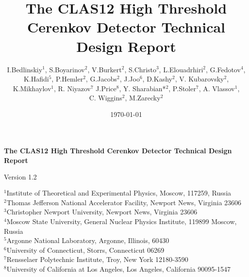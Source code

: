 \documentclass[12pt]{article}
\title{The CLAS12 High Threshold Cerenkov Detector Technical Design Report}
\author{I.Bedlinskiy$^{1}$, S.Boyarinov$^{2}$, V.Burkert$^{2}$, S.Christo$^{3}$, L.Elouadrhiri$^{2}$, G.Fedotov$^{4}$, \\ K.Hafidi$^{5}$, P.Hemler$^{2}$, G.Jacobs$^{2}$, J.Joo$^{6}$, D.Kashy$^{2}$,  V. Kubarovsky$^{2}$,  \\ K.Mikhaylov$^{1}$, R. Niyazov$^{7}$  J.Price$^{8}$, Y. Sharabian*$^{2}$, P.Stoler$^{7}$, A. Vlassov$^{1}$, \\ C. Wiggins$^{2}$, M.Zarecky$^{2}$}
\date{\today}
\begin{document}
\thispagestyle{empty}
\begin{center}
{\Huge \bf The CLAS12 High Threshold Cerenkov Detector Technical Design Report}
\end{center}
\vspace{2cm}
\begin{figure}[ht]
\begin{center}
\vspace{1cm}
\end{center}
\end{figure}

\begin{center}
\Large Version 1.2
\end{center}

\newpage



\maketitle



\vspace{2cm}

\begin{center}
$^{1}$Institute of Theoretical and Experimental Physics, Moscow, 117259, Russia\\
$^{2}$Thomas Jefferson National Accelerator Facility, Newport News, Virginia 23606\\ 
$^{3}$Christopher Newport University, Newport News, Virginia 23606\\
$^{4}$Moscow State University, General Nuclear Physics Institute, 119899 Moscow, Russia\\
$^{5}$Argonne National Laboratory, Argonne, Illinois, 60430\\
$^{6}$University of Connecticut, Storrs, Connecticut 06269\\
$^{7}$Rensselaer Polytechnic Institute, Troy, New York 12180-3590\\
$^{8}$University of California at Los Angeles, Los Angeles, California  90095-1547
\end{center}

	
\thispagestyle{empty}

\newpage

\tableofcontents

\newpage


\renewcommand{\headrulewidth}{0pt}
\renewcommand{\footrulewidth}{0pt}
\pagestyle{myheading}
\end{document}
